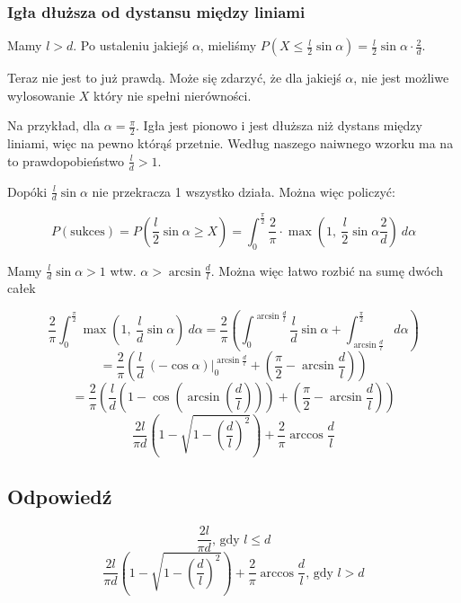 \subsubsection*{Igła dłuższa od dystansu między liniami}
Mamy \(l > d\). Po ustaleniu jakiejś \(\alpha\), mieliśmy
\(
P(X \leq \frac{l}{2}\sin\alpha) =
\frac{l}{2}\sin \alpha \cdot \frac{2}{d}
\).

Teraz nie jest to już prawdą. Może się zdarzyć, że dla jakiejś
\(\alpha\), nie jest możliwe wylosowanie \(X\) który nie spełni nierówności.

Na przykład, dla \(\alpha = \frac{\pi}{2}\).
Igła jest pionowo i jest dłuższa niż dystans między liniami,
więc na pewno którąś przetnie. Według naszego naiwnego wzorku
ma na to prawdopobieństwo \(\frac{l}{d} > 1\).

Dopóki \(\frac{l}{d}\sin \alpha\) nie przekracza 1 wszystko działa. Można
więc policzyć:

\[
	P(\text{sukces})
	= P\left(\frac{l}{2}\sin \alpha \geq X\right)
	= \int_0^{\frac{\pi}2} \frac{2}{\pi}
	\cdot
	\max\left(1,~\frac{l}{2}\sin \alpha \frac{2}{d}
	\right)
	~d\alpha
\]

Mamy \(\frac{l}{d}\sin\alpha > 1\) wtw. \(\alpha > \arcsin \frac{d}{l}\).
Można więc łatwo rozbić na sumę dwóch całek

\[
	\frac{2}{\pi} \int_0^{\frac{\pi}2}
	\max\left(1,~\frac{l}{d}\sin \alpha \right)
	~d\alpha
	= \frac{2}{\pi} \left(
	\int_0^{\arcsin\frac{d}{l}} \frac{l}{d}\sin \alpha
	+
	\int_{\arcsin\frac{d}{l}}^{\frac{\pi}{2}} d\alpha
	\right)
\]
\[
	= \frac{2}{\pi} \left(
	\frac{l}{d}~(-\cos\alpha) \Big|_{0}^{\arcsin\frac{d}{l}}
	+ \left(\frac{\pi}{2} - \arcsin\frac{d}{l} \right)
	\right)
\]
\[
	= \frac{2}{\pi} \left(
	\frac{l}{d}\left(1 - \cos\left(\arcsin\left(\frac{d}{l}
				\right)\right)\right)
	+ \left(\frac{\pi}{2} - \arcsin\frac{d}{l} \right)
	\right)
\]
\[
	\frac{2l}{\pi d} \left(
	1 - \sqrt{1 - \left(\frac{d}{l}\right)^2}\right)
	+ \frac{2}{\pi}\arccos\frac{d}{l}
\]

\subsection*{Odpowiedź}
\[
	\boxed{
		\frac{2l}{\pi d}\text{, gdy } l \leq d
	}
\]
\[
	\boxed{
		\frac{2l}{\pi d} \left(
		1 - \sqrt{1 - \left(\frac{d}{l}\right)^2}\right)
		+ \frac{2}{\pi}\arccos\frac{d}{l}
		\text{, gdy } l > d
	}
\]

